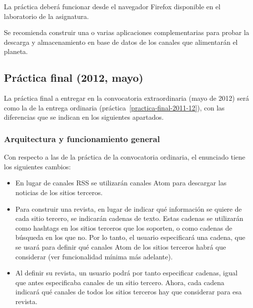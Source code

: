 La práctica deberá funcionar desde el navegador Firefox disponible en el laboratorio de la asignatura.

Se recomienda construir una o varias aplicaciones complementarias para probar la descarga y almacenamiento en base de datos de los canales que alimentarán el planeta.

\subsection{Práctica final (2012, mayo)}
\label{practica-final-2012-05}


La práctica final a entregar en la convocatoria extraordinaria (mayo de 2012) será como la de la entrega ordinaria (práctica~\ref{practica-final-2011-12}), con las diferencias que se indican en los siguientes apartados.

\subsubsection{Arquitectura y funcionamiento general}

Con respecto a las de la práctica de la convocatoria ordinaria, el enunciado tiene los siguientes cambios:

\begin{itemize}
\item En lugar de canales RSS se utilizarán canales Atom para descargar las noticias de los sitios terceros.
\item Para construir una revista, en lugar de indicar qué información se quiere de cada sitio tercero, se indicarán cadenas de texto. Estas cadenas se utilizarán como hashtags en los sitios terceros que los soporten, o como cadenas de búsqueda en los que no. Por lo tanto, el usuario especificará una cadena, que se usará para definir qué canales Atom de los sitios terceros habrá que considerar (ver funcionalidad mínima más adelante).
\item Al definir su revista, un usuario podrá por tanto especificar cadenas, igual que antes especificaba canales de un sitio tercero. Ahora, cada cadena indicará qué canales de todos los sitios terceros hay que considerar para esa revista.
\end{itemize}

